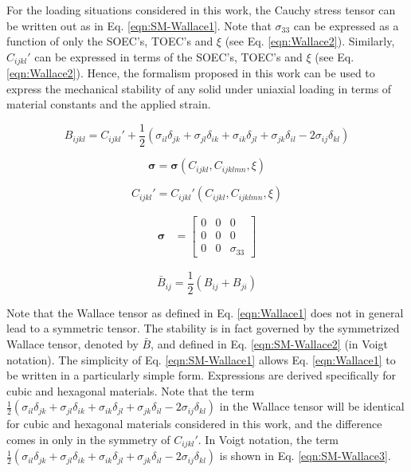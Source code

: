 \documentclass[showpacs,aps,floatfix,prb,reprint,superscriptaddress,onecolumn]{revtex4-1}
\begin{document}
For the loading situations considered in this work, the Cauchy stress tensor can be written out as in Eq. \ref{eqn:SM-Wallace1}. Note that $\sigma_{33}$ can be expressed as a function of only the SOEC's, TOEC's and $\xi$ (see Eq. \ref{eqn:Wallace2}). Similarly, $C_{ijkl}'$ can be expressed in terms of the SOEC's, TOEC's and $\xi$ (see Eq. \ref{eqn:Wallace2}). Hence, the formalism proposed in this work can be used to express the mechanical stability of any solid under uniaxial loading in terms of material constants and the applied strain. 

\begin{equation}
\label{eqn:Wallace1}
B_{ijkl} = C_{ijkl}' + \frac{1}{2} \left(\sigma_{il} \delta_{jk} + \sigma_{jl} \delta_{ik} + \sigma_{ik} \delta_{jl} + \sigma_{jk} \delta_{il} - 2\sigma_{ij} \delta_{kl} \right)
\end{equation}

\begin{equation}
\label{eqn:Wallace2}
\bm{\sigma} = \bm{\sigma} \left(C_{ijkl}, C_{ijklmn}, \xi \right)
\end{equation}

\begin{equation}
\label{eqn:Wallace3}
C_{ijkl}' = C_{ijkl}' \left(C_{ijkl}, C_{ijklmn}, \xi \right)
\end{equation}

\begin{equation}
\label{eqn:SM-Wallace1}
  \begin{aligned}
        \bm{\sigma}&=\begin{bmatrix} 0 & 0 & 0 \\ 0 & 0 & 0 \\ 0 & 0 & \sigma_{33} \end{bmatrix}
       \end{aligned}
\end{equation} 

\begin{equation}
\label{eqn:SM-Wallace2}
\bar{B}_{ij} = \frac{1}{2} \left(B_{ij} + B_{ji} \right)
\end{equation}


Note that the Wallace tensor as defined in Eq. \ref{eqn:Wallace1} does not in general lead to a symmetric tensor. The stability is in fact governed by the symmetrized Wallace tensor, denoted by $\bar{B}$, and defined in Eq. \ref{eqn:SM-Wallace2} (in Voigt notation). The simplicity of Eq. \ref{eqn:SM-Wallace1} allows Eq. \ref{eqn:Wallace1} to be written in a particularly simple form. Expressions are derived specifically for cubic and hexagonal materials. Note that the term $\frac{1}{2} \left(\sigma_{il} \delta_{jk} + \sigma_{jl} \delta_{ik} + \sigma_{ik} \delta_{jl} + \sigma_{jk} \delta_{il} - 2\sigma_{ij} \delta_{kl} \right)$ in the Wallace tensor will be identical for cubic and hexagonal materials considered in this work, and the difference comes in only in the symmetry of $C_{ijkl}'$. In Voigt notation, the term $\frac{1}{2} \left(\sigma_{il} \delta_{jk} + \sigma_{jl} \delta_{ik} + \sigma_{ik} \delta_{jl} + \sigma_{jk} \delta_{il} - 2\sigma_{ij} \delta_{kl} \right)$ is shown in Eq. \ref{eqn:SM-Wallace3}.
\end{document}
